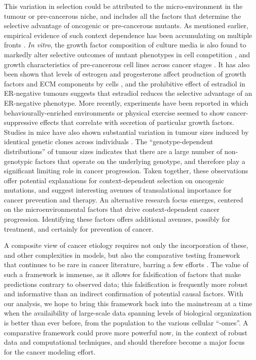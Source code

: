 \documentclass[10pt,twocolumn,twoside]{article}
\begin{document}
This variation in selection could be attributed to the micro-environment in the tumour or pre-cancerous niche, and includes all the factors that determine the selective advantage of oncogenic or pre-cancerous mutants. As mentioned earlier, empirical evidence of such context dependence has been accumulating on multiple fronts \cite{Hansen2000,Pietras2010,Hanahan2012,Cabarcas2011a}. \textit{In vitro}, the growth factor composition of culture media is also found to markedly alter selective outcomes of mutant phenotypes in cell competition \cite{Archetti2015}, and growth characteristics of pre-cancerous cell lines across cancer stages \cite{Chan2014}. It has also been shown that levels of estrogen and progesterone affect production of growth factors and ECM components by cells \cite{Haslam2001,Woodward2000,DICKSON1987}, and the prohibitive effect of estradiol in ER-negative tumours \cite{Garcia1992} suggests that estradiol reduces the selective advantage of an ER-negative phenotype. More recently, experiments have been reported in which behaviourally-enriched environments or physical exercise seemed to show cancer-suppressive effects \cite{Cao2010,Rundqvist2013} that correlate with secretion of particular growth factors. Studies in mice have also shown substantial variation in tumour sizes induced by identical genetic clones across individuals \cite{Rogers2017}. The ``genotype-dependent distributions'' of tumour sizes indicates that there are a large number of non-genotypic factors that operate on the underlying genotype, and therefore play a significant limiting role in cancer progression. Taken together, these observations offer potential explanations for context-dependent selection on oncogenic mutations, and suggest interesting avenues of transalational importance for cancer prevention and therapy. An alternative research focus emerges, centered on the microenvironmental factors that drive context-dependent cancer progression. Identifying these factors offers additional avenues, possibly for treatment, and certainly for prevention of cancer.

A composite view of cancer etiology requires not only the incorporation of these, and other complexities in models, but also the comparative testing framework that continues to be rare in cancer literature, barring a few efforts \cite{Frank2007}. The value of such a framework is immense, as it allows for falsification of factors that make predictions contrary to observed data; this falsification is frequently more robust and informative than an indirect confirmation of potential causal factors. With our analysis, we hope to bring this framework back into the mainstream at a time when the availaibility of large-scale data spanning levels of biological organization is better than ever before, from the population to the various cellular ``-omes''. A comparative framework could prove more powerful now, in the context of robust data and computational techniques, and should therefore become a major focus for the cancer modeling effort.
\end{document}
